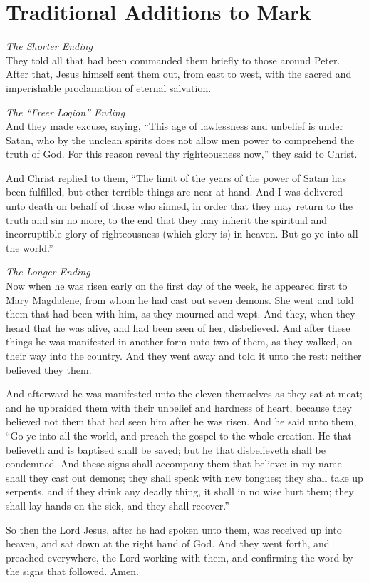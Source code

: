 \chapter{Traditional Additions to Mark}
\textit{The Shorter Ending}\\
They told all that had been commanded them briefly to those around Peter. After that, Jesus himself sent them out, from east to west, with the sacred and imperishable proclamation of eternal salvation.
\par
\noindent
\textit{The ``Freer Logion'' Ending}\\
And they made excuse, saying, ``This age of lawlessness and unbelief is under Satan, who by the unclean spirits does not allow men power to comprehend the truth of God. For this reason reveal thy righteousness now,'' they said to Christ.
\par
And Christ replied to them, ``The limit of the years of the power of Satan has been fulfilled, but other terrible things are near at hand. And I was delivered unto death on behalf of those who sinned, in order that they may return to the truth and sin no more, to the end that they may inherit the spiritual and incorruptible glory of righteousness (which glory is) in heaven. But go ye into all the world.''\par
\noindent
\textit{The Longer Ending}\\
{Now when he was risen early on the first day of the week, he appeared first to Mary Magdalene, from whom he had cast out seven demons.}
{She went and told them that had been with him, as they mourned and wept.}
{And they, when they heard that he was alive, and had been seen of her, disbelieved.}
{And after these things he was manifested in another form unto two of them, as they walked, on their way into the country.}
{And they went away and told it unto the rest: neither believed they them.}
\par
{And afterward he was manifested unto the eleven themselves as they sat at meat; and he upbraided them with their unbelief and hardness of heart, because they believed not them that had seen him after he was risen.}
{And he said unto them, ``Go ye into all the world, and preach the gospel to the whole creation.}
{He that believeth and is baptised shall be saved; but he that disbelieveth shall be condemned.}
{And these signs shall accompany them that believe: in my name shall they cast out demons; they shall speak with new tongues;}
{they shall take up serpents, and if they drink any deadly thing, it shall in no wise hurt them; they shall lay hands on the sick, and they shall recover.''}
\par
{So then the Lord Jesus, after he had spoken unto them, was received up into heaven, and sat down at the right hand of God.}
{And they went forth, and preached everywhere, the Lord working with them, and confirming the word by the signs that followed. Amen.}